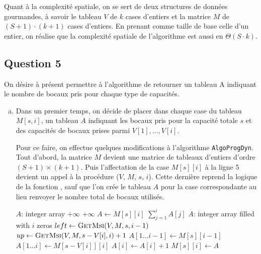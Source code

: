 \documentclass[12pt,a4paper]{article}
\begin{document}
\begin{enumerate}[a)]
Quant \`a la complexit\'e spatiale, on se sert de deux structures de donn\'ees gourmandes, \`a savoir le tableau $V$ de $k$ cases d'entiers et la matrice $M$ de $(S+1)\cdot (k+1)$ cases d'entiers. En prenant comme taille de base celle d'un entier, on r\'ealise que la complexit\'e spatiale de l'algorithme est aussi en $\Theta(S\cdot k)$.
\end{enumerate}

\subsection*{Question 5}
On d\'esire \`a pr\'esent permettre \`a l'algorithme de retourner un tableau A indiquant le nombre de bocaux pris pour chaque type de capacit\'es.

\begin{enumerate}[a)]
 \item Dans un premier temps, on d\'ecide de placer dans chaque case du tableau $M[s,i]$, un tableau $A$ indiquant les bocaux pris pour la capacit\'e totale $s$ et des capacit\'es de bocaux prises parmi $V[1],\dotsc,V[i]$. 
 
 Pour ce faire, on effectue quelques modifications \`a l'algorithme \texttt{AlgoProgDyn}. Tout d'abord, la matrice $M$ devient une matrice de tableaux d'entiers d'ordre $(S+1) \times (k+1)$.  Puis l'affectation de la case $M[s][i]$ \`a la ligne 5 devient un appel \`a la proc\'edure ($V$, $M$, $s$, $i$). Cette derni\`ere reprend la logique de la fonction , sauf que l'on cr\'ee le tableau $A$ pour la case correspondante au lieu renvoyer le nombre total de bocaux utilis\'es. 
 
 \begin{algorithm}
\begin{algorithmic}[1]
    \State $A$: integer array
        \State {}
        \State \Return $+\infty$
        \State \Return $+\infty$
    \Else
        \State $A \gets M[s][i]$
        \State \Return $\sum_{j=1}^{i} A[j]$
    \EndIf
\EndFunction
\Statex
{}
    \State $A$: integer array filled with $i$ zeros
        \State $left \gets \Call{GetMsi}{V, M, s, i-1}$
        \State $up \gets \Call{GetMsi}{V, M, s-V[i], i}+1$
            \State $A[1\dotsc i-1] \gets M[s][i-1]$
        \Else
            \State $A[1\dotsc i] \gets M[s-V[i]][i]$
            \State $A[i] \gets A[i] + 1$
        \EndIf
    \EndIf
    \State $M[s][i] \gets A$
\EndFunction
\end{algorithmic}
\end{algorithm}
 

\end{enumerate}
\end{document}

